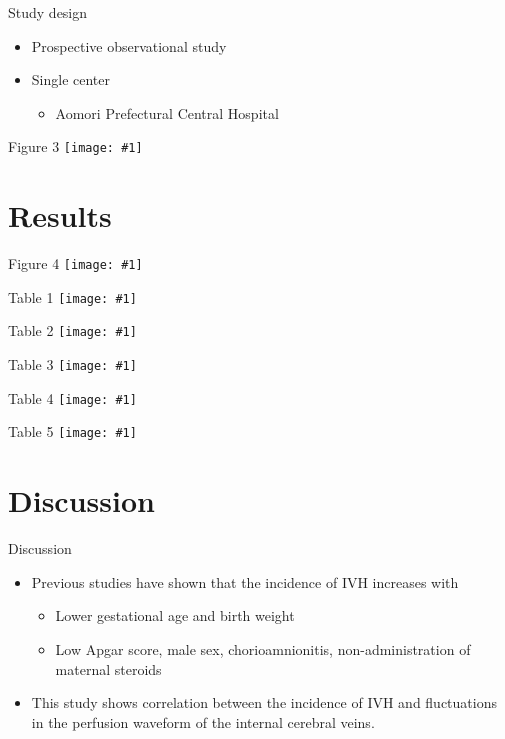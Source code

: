 \documentclass{beamer}
\newcommand*{\solo}[1]{\centering\texttt{[image: \#1]}}
\begin{document}
\begin{frame}{Study design}
    \begin{itemize}
        \item Prospective observational study
        \item Single center
            \begin{itemize}
                \item Aomori Prefectural Central Hospital
            \end{itemize}
    \end{itemize}
\end{frame}

\begin{frame}{Figure 3}
    \solo{F3.png}
\end{frame}

\section{Results}
\begin{frame}{Figure 4}
    \solo{F4.png}
\end{frame}

\begin{frame}{Table 1}
    \solo{T1.eps}
\end{frame}

\begin{frame}{Table 2}
    \solo{T2.eps}
\end{frame}

\begin{frame}{Table 3}
    \solo{T3.eps}
\end{frame}

\begin{frame}{Table 4}
    \solo{T4.eps}
\end{frame}

\begin{frame}{Table 5}
    \solo{T5.eps}
\end{frame}

\section{Discussion}
\begin{frame}{Discussion}
    \begin{itemize}
        \item Previous studies have shown that the incidence of IVH increases with
            \begin{itemize}
                \item Lower gestational age and birth weight
                \item Low Apgar score, male sex, chorioamnionitis, non-administration of maternal steroids
            \end{itemize}
        \item This study shows correlation between the incidence of IVH and
            fluctuations in the perfusion waveform of the internal cerebral
            veins.
    \end{itemize}
\end{frame}
\end{document}
